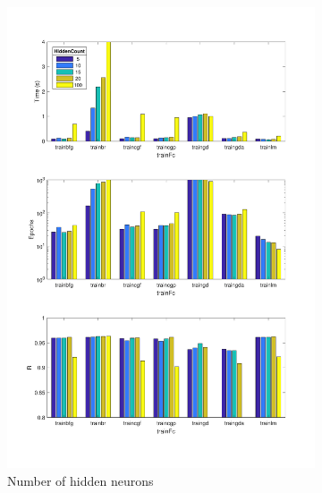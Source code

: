 \begin{landscape}
    \thispagestyle{empty}
    \begin{figure}[p]
        \begin{subfigure}{0.37\linewidth}
            \includegraphics[width=\linewidth]{img/HiddenCount.pdf}
            \caption{Number of hidden neurons}
        \end{subfigure}
        \begin{subfigure}{0.37\linewidth}

\end{subfigure}
\end{figure}
\end{landscape}
